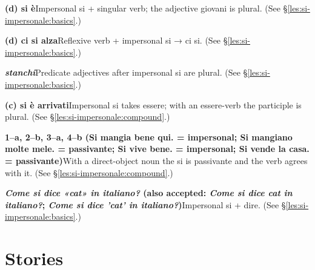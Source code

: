 \documentclass[11pt,a4paper,twoside,openright]{book}
\newcommand{\answerheading}[1]{\par\medskip\noindent{\sffamily\bfseries\small #1}\par\nopagebreak}
\begin{document}
\answerheading{\S\ref{les:si-impersonale} Impersonal si}\label{ans:si-impersonale}
\begin{answers}
\item\relax \textbf{(d) si è}\newline Impersonal si + singular verb; the adjective giovani is plural. {\color{muted}(See \S\ref{les:si-impersonale:basics}.)}
\item\relax \textbf{(d) ci si alza}\newline Reflexive verb + impersonal si → ci si. {\color{muted}(See \S\ref{les:si-impersonale:basics}.)}
\item\relax \textbf{\textit{stanchi}}\newline Predicate adjectives after impersonal si are plural. {\color{muted}(See \S\ref{les:si-impersonale:basics}.)}
\item\relax \textbf{(c) si è arrivati}\newline Impersonal si takes essere; with an essere-verb the participle is plural. {\color{muted}(See \S\ref{les:si-impersonale:compound}.)}
\item\relax \textbf{1--a, 2--b, 3--a, 4--b {\color{muted}(Si mangia bene qui. = impersonal; Si mangiano molte mele. = passivante; Si vive bene. = impersonal; Si vende la casa. = passivante)}}\newline With a direct-object noun the si is passivante and the verb agrees with it. {\color{muted}(See \S\ref{les:si-impersonale:compound}.)}
\item\relax \textbf{\textit{Come si dice «cat» in italiano?} {\color{muted}(also accepted: \textit{Come si dice cat in italiano?}; \textit{Come si dice 'cat' in italiano?})}}\newline Impersonal si + dire. {\color{muted}(See \S\ref{les:si-impersonale:basics}.)}
\end{answers}

\section*{Stories}
\end{document}
